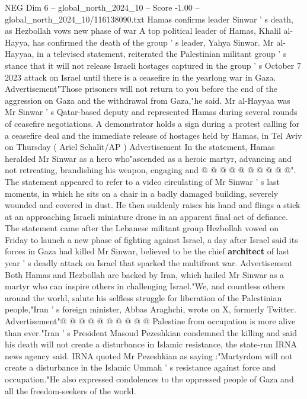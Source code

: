 \begin{textsample}{NEG Dim 6 – global\_north\_2024\_10 – Score -1.00 – global\_north\_2024\_10/116138090.txt}  \label{ex:f6_neg_051}
Hamas confirms leader Sinwar ' s death, as Hezbollah vows new phase of war A top political leader of Hamas, Khalil al-Hayya, has confirmed the death of the group ' s leader, Yahya Sinwar.
Mr al-Hayyaa, in a televised statement, reiterated the Palestinian militant group ' s stance that it will not release Israeli hostages captured in the group ' s October 7 2023 attack on Israel until there is a ceasefire in the yearlong war in Gaza.
Advertisement"Those prisoners will not return to you before the end of the aggression on Gaza and the withdrawal from Gaza,"he said.
Mr al-Hayyaa was Mr Sinwar ' s Qatar-based deputy and represented Hamas during several rounds of ceasefire negotiations.
A demonstrator holds a sign during a protest calling for a ceasefire deal and the immediate release of hostages held by Hamas, in Tel Aviv on Thursday ( Ariel Schalit/AP ) Advertisement In the statement, Hamas heralded Mr Sinwar as a hero who"ascended as a heroic martyr, advancing and not retreating, brandishing his weapon, engaging and @ @ @ @ @ @ @ @ @ @".
The statement appeared to refer to a video circulating of Mr Sinwar ' s last moments, in which he sits on a chair in a badly damaged building, severely wounded and covered in dust.
He then suddenly raises his hand and flings a stick at an approaching Israeli miniature drone in an apparent final act of defiance.
The statement came after the Lebanese militant group Hezbollah vowed on Friday to launch a new phase of fighting against Israel, a day after Israel said its forces in Gaza had killed Mr Sinwar, believed to be the chief \textbf{architect} of last year ' s deadly attack on Israel that sparked the multifront war.
Advertisement Both Hamas and Hezbollah are backed by Iran, which hailed Mr Sinwar as a martyr who can inspire others in challenging Israel."We, and countless others around the world, salute his selfless struggle for liberation of the Palestinian people,"Iran ' s foreign minister, Abbas Araghchi, wrote on X, formerly Twitter.
Advertisement"@ @ @ @ @ @ @ @ @ @ Palestine from occupation is more alive than ever."Iran ' s President Masoud Pezeshkian condemned the killing and said his death will not create a disturbance in Islamic resistance, the state-run IRNA news agency said.
IRNA quoted Mr Pezeshkian as saying :"Martyrdom will not create a disturbance in the Islamic Ummah ' s resistance against force and occupation."He also expressed condolences to the oppressed people of Gaza and all the freedom-seekers of the world.

\end{textsample}
